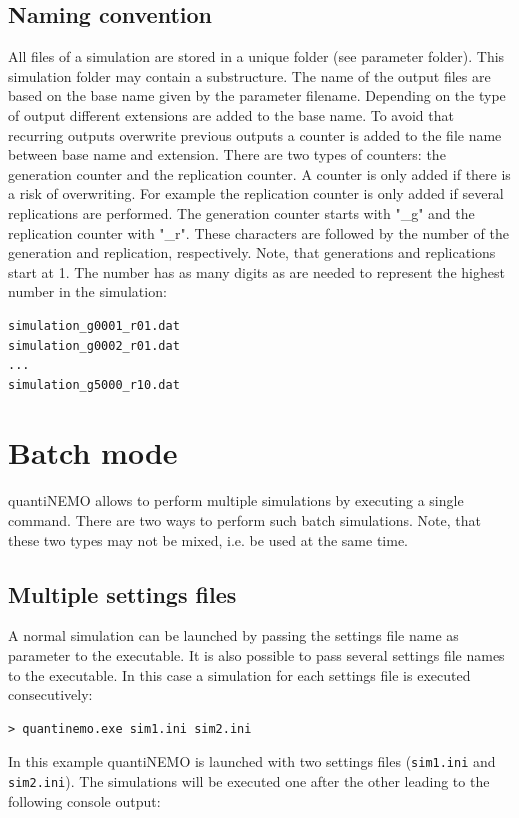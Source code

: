 \documentclass[letterpaper,12pt,oneside]{book}
\begin{document}
\subsection{Naming convention}
All files of a simulation are stored in a unique folder (see parameter \textsf{folder}). This simulation folder may contain a substructure. The name of the output files are based on the base name given by the parameter \textsf{filename}. Depending on the type of output different extensions are added to the base name. To avoid that recurring outputs overwrite previous outputs a counter is added to the file name between base name and extension. There are two types of counters: the generation counter and the replication counter. A counter is only added if there is a risk of overwriting. For example the replication counter is only added if several replications are performed. The generation counter starts with "\_g" and the replication counter with "\_r". These characters are followed by the number of the generation and replication, respectively. Note, that generations and replications start at 1. The number has as many digits as are needed to represent the highest number in the simulation: 

\begin{lstlisting}[frame=single]
simulation_g0001_r01.dat
simulation_g0002_r01.dat
...
simulation_g5000_r10.dat
\end{lstlisting}


\section{Batch mode}\label{batchMode}
quantiNEMO allows to perform multiple simulations by executing a single command. There are two ways to perform such batch simulations. Note, that these two types may not be mixed, i.e. be used at the same time.

\subsection{Multiple settings files}\label{multiFiles}
A normal simulation can be launched by passing the settings file name as parameter to the executable. It is also possible to pass several settings file names to the executable. In this case a simulation for each settings file is executed consecutively: 
\begin{lstlisting}[frame=single]
> quantinemo.exe sim1.ini sim2.ini
\end{lstlisting}
In this example quantiNEMO is launched with two settings files (\texttt{sim1.ini} and \texttt{sim2.ini}). The simulations will be executed one after the other leading to the following console output:
\end{document}
